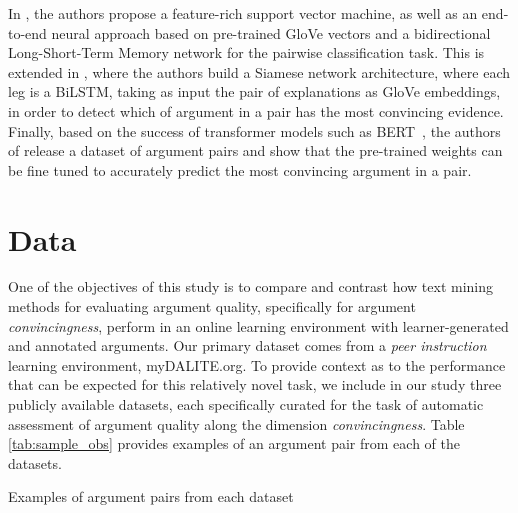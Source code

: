 \documentclass[runningheads]{llncs}
\begin{document}
In \cite{habernal_which_2016}, the authors propose a feature-rich support 
vector machine, as well as an end-to-end neural approach based on pre-trained 
GloVe vectors\cite{pennington_glove:_2014} and a bidirectional Long-Short-Term 
Memory network for the pairwise classification task. 
This is extended in \cite{gleize_are_2019}, where the authors build a Siamese 
network architecture, where each leg is a BiLSTM, taking as input the pair of 
explanations as GloVe embeddings, in order to detect which of argument in a 
pair has the most convincing evidence.
Finally, based on the success of transformer models such as 
BERT~\cite{devlin_bert_2018}, the authors of \cite{toledo_automatic_2019}  
release a dataset of argument pairs and show that the pre-trained weights can 
be fine tuned to accurately predict the most convincing argument in a pair.


\section{Data}

One of the objectives of this study is to compare and contrast how text 
mining methods for evaluating argument quality, specifically for argument 
\textit{convincingness}, perform in an online learning environment with 
learner-generated and annotated arguments. 
Our primary dataset comes from a \textit{peer instruction} learning 
environment, myDALITE.org. 
To provide context as to the performance that can be expected for this 
relatively novel task, we include in our study three publicly available 
datasets, each specifically curated for the task of automatic assessment of 
argument quality along the dimension \textit{convincingness}. 
Table \ref{tab:sample_obs} provides examples of an argument pair 
from each of the datasets.


\begin{table}
	\begin{subtable}[t]{\textwidth}
	
	\end{subtable}
	\begin{subtable}[t]{\textwidth}
	
	\end{subtable}
	\begin{subtable}[t]{\textwidth}
	
	\end{subtable}
	\caption{Examples of argument pairs from each dataset}
	\label{tab:sample_obs}
\end{table}
\end{document}

